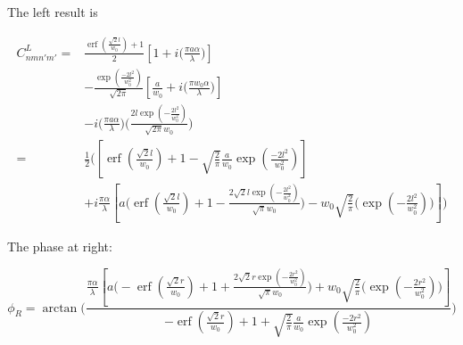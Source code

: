 \documentclass[aps,twoside,secnumarabic,balancelastpage,amsmath,amssymb,nofootinbib,hyperref=pdftex]{revtex4}
\begin{document}
The left result is

\begin{align*}
C_{nmn'm'}^{L} =  &
             { \frac{             
             \operatorname{erf}(\frac{\sqrt{2} l}{w_0})
             +1
         	}{2} }
        \left[
				1+
				i \big( \frac{ \pi a \alpha}{ \lambda} \big)
			\right]
	\\& -
\frac{\exp( \frac{-2l^2}{w_0^2})}{\sqrt{2 \pi}}
        	\left[
                \frac{a}{w_{0}}		
                +
                i  \big( \frac{\pi w_{0} \alpha}{\lambda} \big)
			\right]
	\\& -
            			i  
				\big( \frac{\pi a \alpha}{ \lambda} \big)
                \Bigg(
                        	\frac
                        	{2 l \exp({-\frac{2l^2}{w_0^2}})}
                        	{ \sqrt{2 \pi} w_0}
                \Bigg)
                  \\=&
\frac{1}{2}	(	
		\left[            
             \operatorname{erf}(\frac{\sqrt{2} l}{w_0})
             +
             1
         -
         \sqrt{ \frac{2}{\pi} }
         \frac{a}{w_{0}}
         \exp( \frac{-2l^2}{w_0^2})                
		\right]
	\\& +
	i \frac{\pi \alpha}{\lambda}
	\left[
	  a 
		\Bigg(\operatorname{erf}(\frac{\sqrt{2} l}{w_0})
             +
             1
             -
                        	\frac
                        	{2 \sqrt{2} l \exp({-\frac{2l^2}{w_0^2}})}
                        	{ \sqrt{\pi} w_0} 
             \Bigg)        
        -  
        w_{0}\sqrt{\frac{2}{\pi}}
        \Bigg(        	                        	
                        \exp({-\frac{2l^2}{w_0^2}}) 
        \Bigg)  
	\right] )    
\end{align*}

The phase at right:

\begin{equation*}
	\phi_R =
			\arctan
				\big(
				\frac{
							\frac{\pi \alpha}{\lambda}
				\left[
				  a 
					\Bigg(- \operatorname{erf}(\frac{\sqrt{2} r}{w_0})
			             +
			             1
			             +
			                        	\frac
			                        	{2 \sqrt{2} r \exp({-\frac{2r^2}{w_0^2}})}
			                        	{ \sqrt{\pi} w_0} 
			             \Bigg)        
			        +  
        w_{0}\sqrt{\frac{2}{\pi}}
        \Bigg(        	                        	
                        \exp({-\frac{2r^2}{w_0^2}}) 
			        \Bigg) 
				\right] }
				{
				             -\operatorname{erf}(\frac{\sqrt{2} r}{w_0})
             +
             1
         +
         \sqrt{ \frac{2}{\pi} }
         \frac{a}{w_{0}}
         \exp( \frac{-2r^2}{w_0^2}) }
	\big)
\end{equation*}
\end{document}
